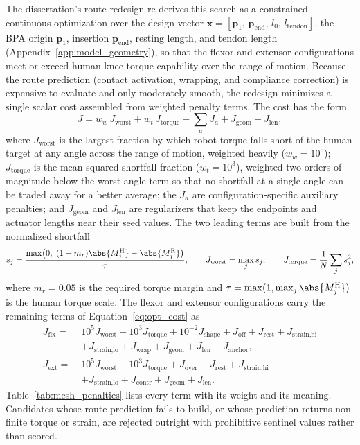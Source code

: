 The dissertation's route redesign re-derives this search as a constrained continuous optimization over the design vector $\mathbf{x} = [\mathbf{p}_{1},\, \mathbf{p}_{\mathrm{end}},\, l_{0},\, l_{\mathrm{tendon}}]$, the BPA origin $\mathbf{p}_{1}$, insertion $\mathbf{p}_{\mathrm{end}}$, resting length, and tendon length (Appendix~\ref{app:model_geometry}), so that the flexor and extensor configurations meet or exceed human knee torque capability over the range of motion. Because the route prediction (contact activation, wrapping, and compliance correction) is expensive to evaluate and only moderately smooth, the redesign minimizes a single scalar cost assembled from weighted penalty terms. The cost has the form
\begin{equation}
    J = w_{w}\,J_{\text{worst}} + w_{t}\,J_{\text{torque}} + \textstyle\sum_{a} J_{a} + J_{\text{geom}} + J_{\text{len}},
    \label{eq:opt_cost}
\end{equation}
where $J_{\text{worst}}$ is the largest fraction by which robot torque falls short of the human target at any angle across the range of motion, weighted heavily ($w_{w} = 10^{5}$); $J_{\text{torque}}$ is the mean-squared shortfall fraction ($w_{t} = 10^{3}$), weighted two orders of magnitude below the worst-angle term so that no shortfall at a single angle can be traded away for a better average; the $J_{a}$ are configuration-specific auxiliary penalties; and $J_{\text{geom}}$ and $J_{\text{len}}$ are regularizers that keep the endpoints and actuator lengths near their seed values. The two leading terms are built from the normalized shortfall
\begin{equation}
s_{j} = \frac{\max\!\left(0,\; (1+m_{r})\abs{M^{\mathrm{H}}_{j}} - \abs{M^{\mathrm{R}}_{j}}\right)}{\tau},
\qquad
J_{\text{worst}} = \max_{j} s_{j},
\qquad
J_{\text{torque}} = \frac{1}{N}\sum_{j} s_{j}^{2},
\label{eq:mesh_penalty_def}
\end{equation}
where $m_{r} = 0.05$ is the required torque margin and $\tau = \max(1, \max_{j}\abs{M^{\mathrm{H}}_{j}})$ is the human torque scale. The flexor and extensor configurations carry the remaining terms of Equation~\eqref{eq:opt_cost} as
\begin{align}
J_{\mathrm{flx}} =\;& 10^{5}J_{\text{worst}} + 10^{3}J_{\text{torque}} + 10^{-2}J_{\text{shape}} + J_{\text{off}} + J_{\text{rest}} + J_{\text{strain,hi}} \nonumber\\
& + J_{\text{strain,lo}} + J_{\text{wrap}} + J_{\text{geom}} + J_{\text{len}} + J_{\text{anchor}},
\label{eq:opt_cost_flx}\\[4pt]
J_{\mathrm{ext}} =\;& 10^{5}J_{\text{worst}} + 10^{3}J_{\text{torque}} + J_{\text{over}} + J_{\text{rest}} + J_{\text{strain,hi}} \nonumber\\
& + J_{\text{strain,lo}} + J_{\text{contr}} + J_{\text{geom}} + J_{\text{len}}.
\label{eq:opt_cost_ext}
\end{align}
Table~\ref{tab:mesh_penalties} lists every term with its weight and its meaning. Candidates whose route prediction fails to build, or whose prediction returns non-finite torque or strain, are rejected outright with prohibitive sentinel values rather than scored.


